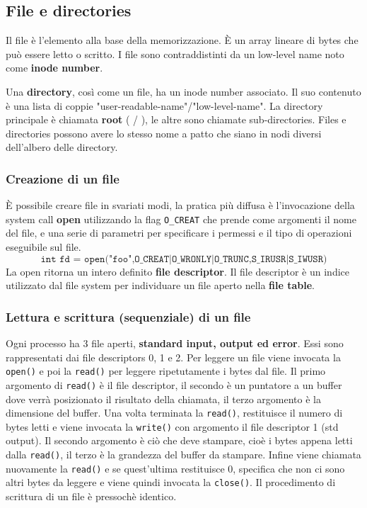 \documentclass[12pt, twoside, letterpaper]{article}
\begin{document}
		\subsection{File e directories}
			Il file è l'elemento alla base della memorizzazione. È un array lineare di bytes che può essere letto o scritto. I file sono contraddistinti da un low-level name noto come \textbf{inode number}.
			
			Una \textbf{directory}, così come un file, ha un inode number associato. Il suo contenuto è una lista di coppie "user-readable-name"/"low-level-name". La directory principale è chiamata \textbf{root} ( / ), le altre sono chiamate sub-directories. Files e directories possono avere lo stesso nome a patto che siano in nodi diversi dell'albero delle directory.
			
			\subsubsection{Creazione di un file}
				È possibile creare file in svariati modi, la pratica più diffusa è l'invocazione della system call \textbf{open} utilizzando la flag \texttt{O\_CREAT} che prende come argomenti il nome del file, e una serie di parametri per specificare i permessi e il tipo di operazioni eseguibile sul file. 
				$$ \texttt{int fd = open("foo",O\_CREAT|O\_WRONLY|O\_TRUNC,S\_IRUSR|S\_IWUSR)} $$
				La open ritorna un intero definito \textbf{file descriptor}. Il file descriptor è un indice utilizzato dal file system per individuare un file aperto nella \textbf{file table}.
				
			\subsubsection{Lettura e scrittura (sequenziale) di un file}
				Ogni processo ha 3 file aperti, \textbf{standard input, output ed error}. Essi sono rappresentati dai file descriptors 0, 1 e 2. Per leggere un file viene invocata la \texttt{open()} e poi la \texttt{read()} per leggere ripetutamente i bytes dal file. Il primo argomento di \texttt{read()} è il file descriptor, il secondo è un puntatore a un buffer dove verrà posizionato il risultato della chiamata, il  terzo argomento è la dimensione del buffer. Una volta terminata la \texttt{read()}, restituisce il numero di bytes letti e viene invocata la \texttt{write()} con argomento il file descriptor 1 (std output). Il secondo argomento è ciò che deve stampare, cioè i bytes appena letti dalla \texttt{read()}, il terzo è la grandezza del buffer da stampare. Infine viene chiamata nuovamente la \texttt{read()} e se quest'ultima restituisce 0, specifica che non ci sono altri bytes da leggere e viene quindi invocata la \texttt{close()}. Il procedimento di scrittura di un file è pressochè identico.
				
\end{document}
